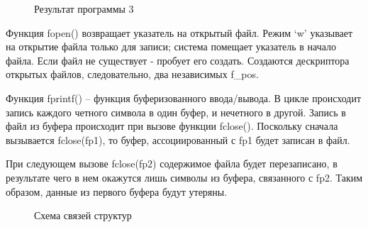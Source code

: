 \documentclass[14pt, a4paper]{extarticle}
\begin{document}
\begin{figure}[h!]
	\caption{Результат программы 3}
\end{figure}\par

Функция fopen() возвращает указатель на
открытый файл. Режим ‘w’ указывает на открытие файла только для записи; 
система помещает указатель в начало файла.
Если файл не существует - пробует его создать. Создаются дескриптора открытых файлов, следовательно, два независимых f\_pos.

Функция fprintf() – функция буферизованного ввода/вывода.
В цикле происходит запись каждого четного символа в один буфер, и нечетного в другой. Запись в файл из буфера
происходит при вызове функции fclose().
Поскольку сначала вызывается fclose(fp1), то буфер, ассоциированный с fp1
будет записан в файл. 

При следующем вызове fclose(fp2) содержимое файла будет
перезаписано, в результате чего в нем окажутся лишь символы из буфера,
связанного с fp2. Таким образом, данные из первого буфера будут утеряны.

\begin{figure}[h!]
	\caption{Схема связей структур}
\end{figure}\par
\end{document}

